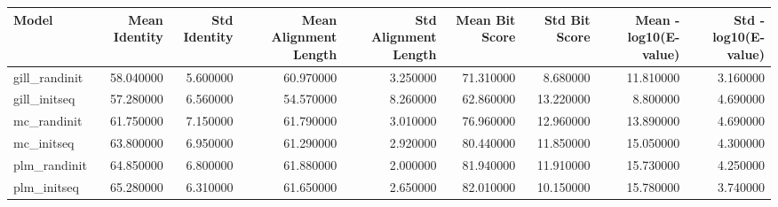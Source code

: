 \begin{tabular}{lrrrrrrrr}
\toprule
Model & Mean Identity & Std Identity & Mean Alignment Length & Std Alignment Length & Mean Bit Score & Std Bit Score & Mean -log10(E-value) & Std -log10(E-value) \\
\midrule
gill_randinit & 58.040000 & 5.600000 & 60.970000 & 3.250000 & 71.310000 & 8.680000 & 11.810000 & 3.160000 \\
gill_initseq & 57.280000 & 6.560000 & 54.570000 & 8.260000 & 62.860000 & 13.220000 & 8.800000 & 4.690000 \\
mc_randinit & 61.750000 & 7.150000 & 61.790000 & 3.010000 & 76.960000 & 12.960000 & 13.890000 & 4.690000 \\
mc_initseq & 63.800000 & 6.950000 & 61.290000 & 2.920000 & 80.440000 & 11.850000 & 15.050000 & 4.300000 \\
plm_randinit & 64.850000 & 6.800000 & 61.880000 & 2.000000 & 81.940000 & 11.910000 & 15.730000 & 4.250000 \\
plm_initseq & 65.280000 & 6.310000 & 61.650000 & 2.650000 & 82.010000 & 10.150000 & 15.780000 & 3.740000 \\
\bottomrule
\end{tabular}

